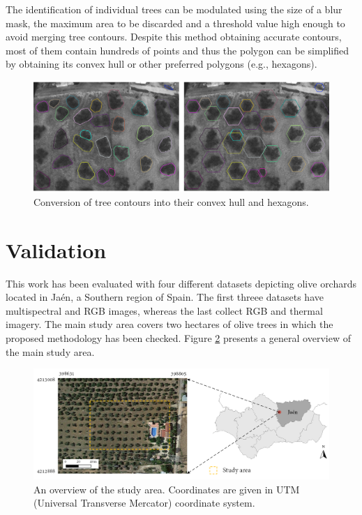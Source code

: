 The identification of individual trees can be modulated using the size of a blur mask, the maximum area to be discarded and a threshold value high enough to avoid merging tree contours. Despite this method obtaining accurate contours, most of them contain hundreds of points and thus the polygon can be simplified by obtaining its convex hull \cite{sklansky_finding_1982} or other preferred polygons (e.g., hexagons). 

\begin{figure}[hbp]
    \centering
    \includegraphics[width=1\linewidth]{figs/image_fusion/convex_hull_contours.png}
    \caption{Conversion of tree contours into their convex hull and hexagons.}
    \label{fig:convex_hull_contours}
\end{figure}

\section{Validation}
\label{sec:image_fusion_evaluation}

This work has been evaluated with four different datasets depicting olive orchards located in Jaén, a Southern region of Spain. The first threee datasets have multispectral and RGB images, whereas the last collect RGB and thermal imagery. The main study area covers two hectares of olive trees in which the proposed methodology has been checked. Figure \ref{fig:image_fusion_study_area} presents a general overview of the main study area.

\begin{figure}[htb]
    \centering
    \includegraphics{figs/image_fusion/study_area.png}
    \caption{An overview of the study area. Coordinates are given in UTM (Universal Transverse Mercator) coordinate system.}
    \label{fig:image_fusion_study_area}
\end{figure}

